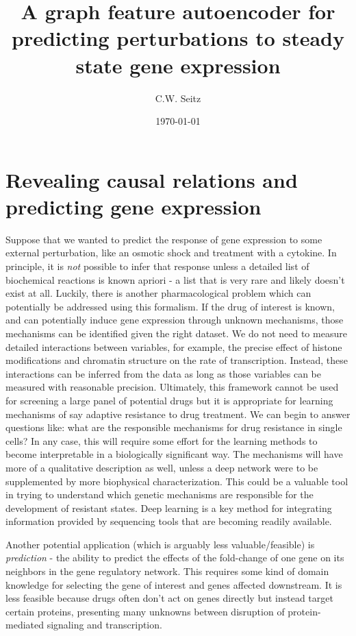 \documentclass{article}
\title{A graph feature autoencoder for predicting perturbations to steady state gene expression}
\author{C.W. Seitz}
\date{\today}
\begin{document}
\maketitle


\section{Revealing causal relations and predicting gene expression}

Suppose that we wanted to predict the response of gene expression to some external perturbation, like an osmotic shock and treatment with a cytokine. In principle, it is \emph{not} possible to infer that response unless a detailed list of biochemical reactions is known apriori - a list that is very rare and likely doesn't exist at all. Luckily, there is another pharmacological problem which can potentially be addressed using this formalism. If the drug of interest is known, and can potentially induce gene expression through unknown mechanisms, those mechanisms can be identified given the right dataset. We do not need to measure detailed interactions between variables, for example, the precise effect of histone modifications and chromatin structure on the rate of transcription. Instead, these interactions can be inferred from the data as long as those variables can be measured with reasonable precision. Ultimately, this framework cannot be used for screening a large panel of potential drugs but it is appropriate for learning mechanisms of say adaptive resistance to drug treatment. We can begin to answer questions like: what are the responsible mechanisms for drug resistance in single cells? In any case, this will require some effort for the learning methods to become interpretable in a biologically significant way. The mechanisms will have more of a qualitative description as well, unless a deep network were to be supplemented by more biophysical characterization. This could be a valuable tool in trying to understand which genetic mechanisms are responsible for the development of resistant states. Deep learning is a key method for integrating information provided by sequencing tools that are becoming readily available.

Another potential application (which is arguably less valuable/feasible) is \emph{prediction} - the ability to predict the effects of the fold-change of one gene on its neighbors in the gene regulatory network. This requires some kind of domain knowledge for selecting the gene of interest and genes affected downstream. It is less feasible because drugs often don't act on genes directly but instead target certain proteins, presenting many unknowns between disruption of protein-mediated signaling and transcription.
\end{document}
